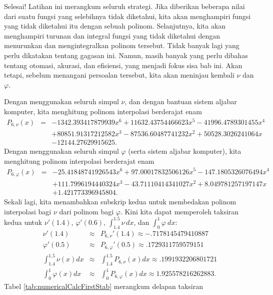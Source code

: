 \noindent Selesai! Latihan ini merangkum seluruh strategi. Jika diberikan
beberapa nilai dari suatu fungsi yang selebihnya tidak diketahui,
kita akan menghampiri fungsi yang tidak diketahui itu dengan sebuah
polinom. Selanjutnya, kita akan menghampiri turunan dan integral fungsi
yang tidak diketahui dengan menurunkan dan mengintegralkan polinom
tersebut. Tidak banyak lagi yang perlu dikatakan tentang gagasan ini.
Namun, masih banyak yang perlu dibahas tentang otomasi, akurasi, dan
efisiensi, yang menjadi fokus sisa bab ini. Akan tetapi, sebelum menangani
persoalan tersebut, kita akan meninjau kembali $\nu$ dan $\varphi$.

Dengan menggunakan seluruh simpul $\nu$, dan dengan bantuan sistem
aljabar komputer, kita menghitung polinom interpolasi berderajat enam\label{integrationWithP6}
\begin{eqnarray*}
P_{6,\nu}(x) & = & -1342.393417879939x^{6}+11632.43754466623x^{5}-41996.4789301455x^{4}\\
 &  & +80851.91317212582x^{3}-87536.60487741232x^{2}+50528.3026241064x\\
 &  & -12144.27629915625.
\end{eqnarray*}
Dengan menggunakan seluruh simpul $\varphi$ (serta sistem aljabar
komputer), kita menghitung polinom interpolasi berderajat enam
\begin{eqnarray*}
P_{6,\varphi}(x) & = & -25.41848741926543x^{6}+97.00017832506126x^{5}-147.1805326076494x^{4}\\
 &  & +111.7996194440324x^{3}-43.71110414341027x^{2}+8.049781257197147x\\
 &  & +1.421773396945804.
\end{eqnarray*}
Sekali lagi, kita menambahkan subskrip kedua untuk membedakan polinom
interpolasi bagi $\nu$ dari polinom bagi $\varphi$. Kini kita dapat
memperoleh taksiran kedua untuk $\nu'(1.4)$, $\varphi'(0.6)$, $\int_{1.4}^{1.5}\nu\,dx$,
dan $\int_{0}^{1}\varphi\:dx$:
\begin{eqnarray*}
\nu'(1.4) & \approx & P_{6,\nu}'(1.4)\approx-.7178145479410887\\
\varphi'(0.5) & \approx & P_{6,\varphi}'(0.5)\approx.1729311759579151\\
\int_{1.4}^{1.5}\nu(x)dx & \approx & \int_{1.4}^{1.5}P_{6,\nu}(x)dx\approx.1991932206801721\\
\int_{0}^{1}\varphi(x)dx & \approx & \int_{0}^{1}P_{6,\varphi}(x)dx\approx1.925578216262883.
\end{eqnarray*}
Tabel \ref{tab:numericalCalcFirstStab} merangkum delapan taksiran

